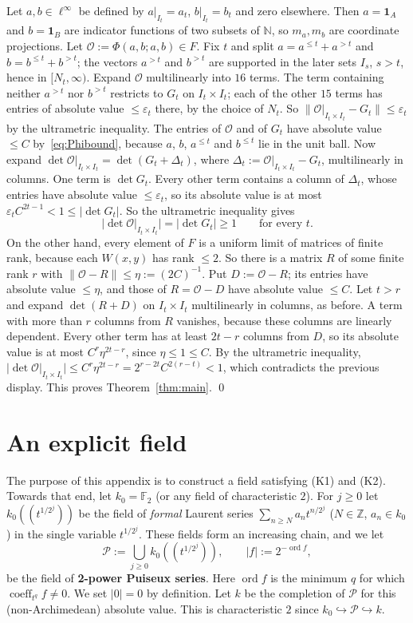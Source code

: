 \documentclass[11pt]{amsart}
\theoremstyle{remark}
\newcommand{\kk}{k}
\newcommand{\linf}{\ell^\infty}
\newcommand{\N}{\mathbb{N}}
\newcommand{\Z}{\mathbb{Z}}
\newcommand{\cP}{\mathcal{P}}
\newcommand{\coeff}{\operatorname{coeff}}
\newcommand{\abs}[1]{\lvert #1\rvert}
\newcommand{\norm}[1]{\lVert #1\rVert}
\newcommand{\1}{\mathbf{1}}
\begin{document}
Let $a,b\in\linf$ be defined by $a|_{I_t}=a_t$, $b|_{I_t}=b_t$ and zero elsewhere. Then
$a=\1_A$ and $b=\1_B$ are indicator functions of two subsets of $\N$, so $m_a,m_b$ are coordinate projections. Let
$\mathcal O:=\Phi(a,b;a,b)\in F$. Fix $t$ and split $a=a^{\le t}+a^{>t}$ and $b=b^{\le t}+b^{>t}$; the vectors
$a^{>t}$ and $b^{>t}$ are supported in the later sets $I_s$, $s>t$, hence in $[N_t,\infty)$. Expand
$\mathcal O$ multilinearly into $16$ terms. The term containing neither $a^{>t}$ nor $b^{>t}$ restricts to $G_t$ on
$I_t\times I_t$; each of the other $15$ terms has entries of absolute value $\le\varepsilon_t$ there, by the choice of $N_t$. So
$\norm{\mathcal O|_{I_t\times I_t}-G_t}\le\varepsilon_t$ by the ultrametric inequality. The entries of $\mathcal O$ and of $G_t$ have absolute value $\le C$ by~\eqref{eq:Phibound}, because $a$, $b$, $a^{\le t}$ and $b^{\le t}$ lie in the unit ball. Now expand
$\det\mathcal O|_{I_t\times I_t}=\det(G_t+\Delta_t)$, where $\Delta_t:=\mathcal O|_{I_t\times I_t}-G_t$, multilinearly in columns. One
term is $\det G_t$. Every other term contains a column of $\Delta_t$, whose entries have absolute value $\le\varepsilon_t$, so its
absolute value is at most $\varepsilon_tC^{2t-1}<1\le\abs{\det G_t}$. So the ultrametric inequality gives
\[
\abs{\det\mathcal O|_{I_t\times I_t}}=\abs{\det G_t}\ge1\qquad\text{for every }t .
\]
On the other hand, every element of $F$ is a uniform limit of matrices of finite rank, because each $W(x,y)$ has rank
$\le2$. So there is a matrix $R$ of some finite rank $r$ with $\norm{\mathcal O-R}\le\eta:=(2C)^{-1}$. Put $D:=\mathcal O-R$; its
entries have absolute value $\le\eta$, and those of $R=\mathcal O-D$ have absolute value $\le C$. Let $t>r$ and expand $\det(R+D)$ on
$I_t\times I_t$ multilinearly in columns, as before. A term with more than $r$ columns from $R$ vanishes, because these
columns are linearly dependent. Every other term has at least $2t-r$ columns from $D$, so its absolute value is at most
$C^r\eta^{2t-r}$, since $\eta\le1\le C$. By the ultrametric inequality,
$\abs{\det\mathcal O|_{I_t\times I_t}}\le C^r\eta^{2t-r}=2^{r-2t}C^{2(r-t)}<1$, which contradicts the previous display. This
proves Theorem~\ref{thm:main}. \qed

\appendix
\section{An explicit field}\label{sec:field}
The purpose of this appendix is to construct a field satisfying (K1) and (K2). Towards that end, let $k_0=\mathbb F_2$
(or any field of characteristic $2$). For
$j\ge0$ let $k_0((t^{1/2^j}))$ be the field of \emph{formal} Laurent series $\sum_{n\ge N}a_nt^{n/2^j}$ ($N\in\Z$, $a_n\in k_0$) in
the single variable $t^{1/2^j}$. These fields form an
increasing chain, and we let
\[
\cP:=\bigcup_{j\ge0}k_0((t^{1/2^j})),\qquad \abs f:=2^{-\operatorname{ord}f},
\]
be the field of \textbf{2-power Puiseux series}. Here $\operatorname{ord}f$ is the minimum $q$ for which $\coeff_{t^q}f\ne0$. We set $\abs0=0$ by definition.
Let $\kk$ be the completion of $\cP$ for this (non-Archimedean) absolute value. This is characteristic $2$ since
$k_0\hookrightarrow\cP\hookrightarrow\kk$.
\end{document}
